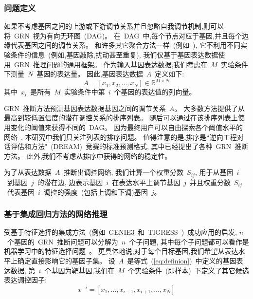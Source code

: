 \subsubsection{问题定义}

如果不考虑基因之间的上游或下游调节关系并且忽略自我调节机制,则可以将~GRN~视为有向无环图~(DAG)。
在~DAG~中,每个节点对应于基因,并且每个边缘代表基因之间的调节关系。
和许多其它聚合方法一样~(例如~\cite{huynh2010inferring,Haury2012,slawek2013ennet,ruyssinck2014nimefi,guo2016gene,zheng2019ensemble}),
它不利用不同实验条件的信息~(例如,基因敲除,扰动甚至重复),
我们仅基于基因表达数据使用~GRN~推理问题的通用框架。
作为输入基因表达数据,我们考虑在~$M$~实验条件下测量~$N$~基因的表达量。
因此,基因表达数据~$A$~定义如下:
\begin{equation}
\label{eq:definion}
A = [x_1,x_2,\ldots,x_N] \in \mathbb{R} ^ {M \times N}
\end{equation}
其中~$x_i$~是所有~$M$~实验条件中第~$i$~个基因的表达值的列向量。

GRN~推断方法预测基因表达数据基因之间的调节关系~$A$。
大多数方法提供了从最高到较低置信度的潜在调控关系的排序列表。
随后可以通过在该排序列表上使用变化的阈值来获得不同的~DAG。
因为最终用户可以自由探索各个阈值水平的网络~\cite{slawek2013ennet},
本研究中我们只关注列表的排序问题。
值得注意的是,排序是``逆向工程对话评估和方法"~(DREAM)~\cite{stolovitzky2007dialogue}竞赛的标准预测格式,
其中已经提出了各种~GRN~推断方法。
此外,我们不考虑从排序中获得的网络的稳定性。

为了从表达数据~$A$~推断出调控网络,
我们计算一个权重分数~$S_{ij}$,
用于从基因~$i$~到基因~$j$~的潜在边,
边表示基因~$i$~在表达水平上调节基因~$j$~并且权重分数~$S_{ij}$~代表基因~$i$~调控的强度~(包括上调和下调)基因~$j$。

\subsubsection{基于集成回归方法的网络推理}
受基于特征选择的集成方法~(例如~GENIE3~\cite{huynh2010inferring}和~TIGRESS~\cite{Haury2012})~成功应用的启发,
$n$~个基因的~GRN~推断问题可以分解为~$n$~个子问题,
其中每个子问题都可以看作是机器学习中的特征选择问题~\cite{nasrabadi2007pattern}。
更具体地说,对于每个目标基因,我们希望从表达水平上确定直接影响它的基因子集。
设~$A$~是等式~(\ref{eq:definion})~中定义的基因表达数据,
第~$i$~个基因为靶基因,我们在~$M$~个实验条件~(即样本)~下定义了其它候选表达调控因子:
\begin{equation}
  \label{eq:x}
  x^{-i} = [x_1,\ldots,x_{i-1},x_{i+1},\ldots,x_N]
  \end{equation}

